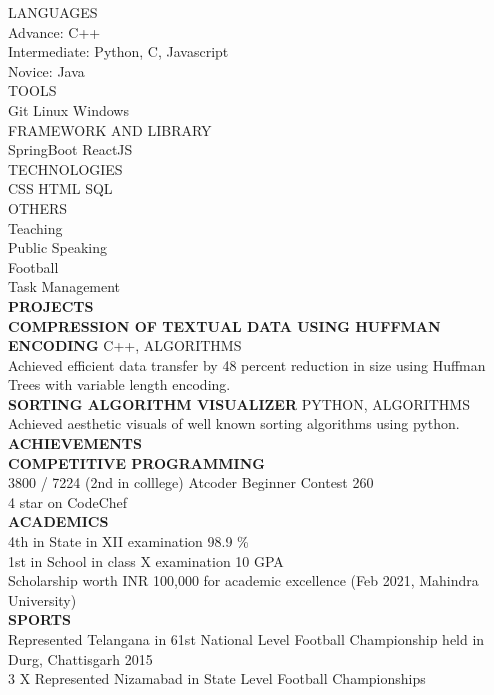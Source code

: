 \documentclass[a4paper, oneside]{article}
\begin{document}
\begin{flushleft}
LANGUAGES \\
Advance: C++ \\
Intermediate: Python, C, Javascript \\
Novice: Java \\

TOOLS \\
\textbullet Git \textbullet Linux \textbullet Windows \\

FRAMEWORK AND LIBRARY \\
\textbullet SpringBoot \textbullet ReactJS \\

TECHNOLOGIES \\
\textbullet CSS \textbullet HTML \textbullet SQL \\

OTHERS \\
\textbullet Teaching \\
\textbullet Public Speaking \\
\textbullet Football \\
\textbullet Task Management \\

\pagebreak
{\large \textbf{PROJECTS}} \\
\textbf{COMPRESSION OF TEXTUAL DATA USING HUFFMAN ENCODING} C++, ALGORITHMS \\
Achieved efficient data transfer by 48 percent reduction in size using Huffman Trees with variable length encoding. \\

\textbf{SORTING ALGORITHM VISUALIZER} PYTHON, ALGORITHMS \\
Achieved aesthetic visuals of well known sorting algorithms using python. \\

{\large \textbf{ACHIEVEMENTS}} \\
\textbf {COMPETITIVE PROGRAMMING} \\
3800 / 7224 (2nd in colllege) Atcoder Beginner Contest 260 \\
4 star on CodeChef \\
\textbf{ACADEMICS} \\
4th in State in XII examination 98.9 \% \\
1st in School in class  X examination 10 GPA \\
Scholarship worth INR 100,000 for academic excellence (Feb 2021, Mahindra University) \\
\textbf{SPORTS} \\
Represented Telangana in 61st National Level Football Championship held in Durg, Chattisgarh 2015 \\
3 X Represented Nizamabad in State Level Football Championships \\


\end{flushleft}
\end{document}
